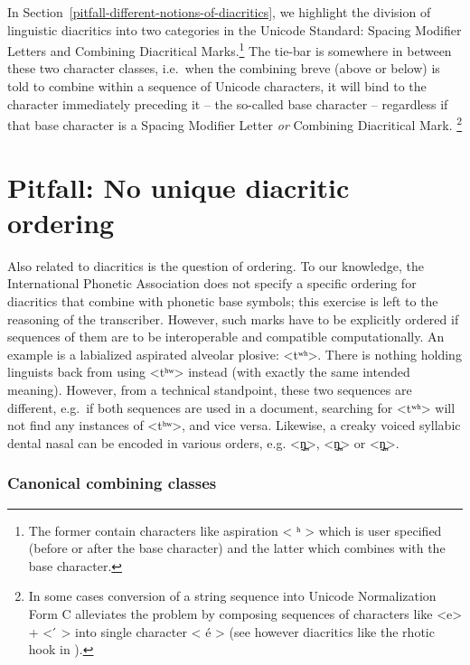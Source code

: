 
In Section~\ref{pitfall-different-notions-of-diacritics}, we highlight
the division of linguistic diacritics into two categories in the Unicode
Standard: Spacing Modifier Letters and Combining Diacritical Marks.\footnote{The
former contain characters like aspiration < ʰ > which is user specified (before
or after the base character) and the latter which combines with the base
character.} The tie-bar is somewhere in between these two character classes,
i.e.~when the combining breve (above or below) is told to combine within a
sequence of Unicode characters, it will bind to the character immediately
preceding it -- the so-called base character -- regardless if that base
character is a Spacing Modifier Letter \textit{or} Combining Diacritical Mark.
\footnote{In some cases conversion of a string sequence into Unicode
Normalization Form C alleviates the problem by composing sequences of characters
like <e> + < ́ > into single character < é > (see however diacritics like the
rhotic hook in ).} 


\section{Pitfall: No unique diacritic ordering}
\label{pitfall-no-unique-diacritic-ordering}

Also related to diacritics is the question of ordering. To our knowledge, the
International Phonetic Association does not specify a specific ordering for
diacritics that combine with phonetic base symbols; this exercise is left to the
reasoning of the transcriber. However, such marks have to be explicitly ordered
if sequences of them are to be interoperable and compatible computationally. An example is a
labialized aspirated alveolar plosive: <tʷʰ>. There is nothing holding linguists
back from using <tʰʷ> instead (with exactly the same intended meaning). However,
from a technical standpoint, these two sequences are different, e.g.~if both
sequences are used in a document, searching for <tʷʰ> will not find any
instances of <tʰʷ>, and vice versa. Likewise, a creaky voiced syllabic dental
nasal can be encoded in various orders, e.g. <n̪̰̩>, <n̩̰̪> or <n̩̪̰>.

\subsubsection*{Canonical combining classes}

